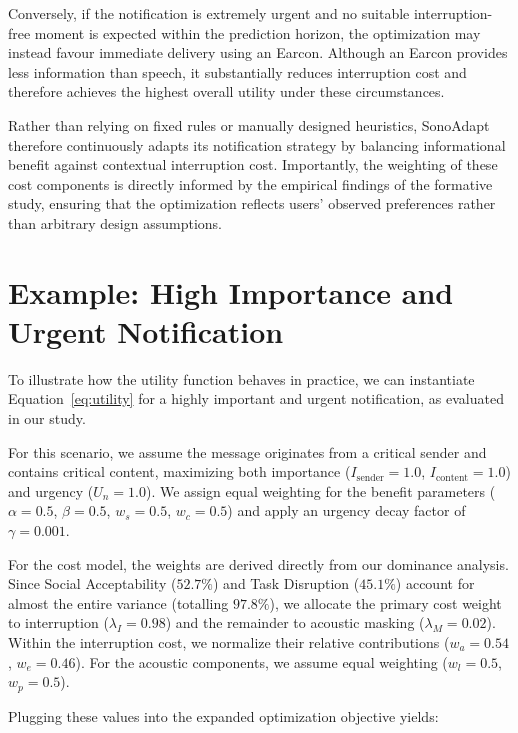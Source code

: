 Conversely, if the notification is extremely urgent and no suitable interruption-free moment is expected within the prediction horizon, the optimization may instead favour immediate delivery using an Earcon. Although an Earcon provides less information than speech, it substantially reduces interruption cost and therefore achieves the highest overall utility under these circumstances.

Rather than relying on fixed rules or manually designed heuristics, SonoAdapt therefore continuously adapts its notification strategy by balancing informational benefit against contextual interruption cost. Importantly, the weighting of these cost components is directly informed by the empirical findings of the formative study, ensuring that the optimization reflects users' observed preferences rather than arbitrary design assumptions.







\section{Example: High Importance and Urgent Notification}

To illustrate how the utility function behaves in practice, we can instantiate Equation~\ref{eq:utility} for a highly important and urgent notification, as evaluated in our study.

For this scenario, we assume the message originates from a critical sender and contains critical content, maximizing both importance ($I_{\mathrm{sender}} = 1.0$, $I_{\mathrm{content}} = 1.0$) and urgency ($U_n = 1.0$). We assign equal weighting for the benefit parameters ($\alpha = 0.5$, $\beta = 0.5$, $w_s = 0.5$, $w_c = 0.5$) and apply an urgency decay factor of $\gamma = 0.001$.

For the cost model, the weights are derived directly from our dominance analysis. Since Social Acceptability ($52.7\%$) and Task Disruption ($45.1\%$) account for almost the entire variance (totalling $97.8\%$), we allocate the primary cost weight to interruption ($\lambda_I = 0.98$) and the remainder to acoustic masking ($\lambda_M = 0.02$). Within the interruption cost, we normalize their relative contributions ($w_a = 0.54$, $w_e = 0.46$). For the acoustic components, we assume equal weighting ($w_l = 0.5$, $w_p = 0.5$).

Plugging these values into the expanded optimization objective yields:

